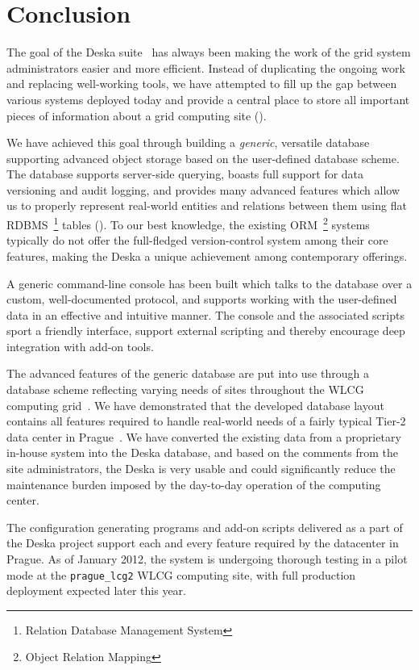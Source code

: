 \documentclass[deska]{subfiles}
\begin{document}
\chapter{Conclusion}
\label{sec:conclusion}

The goal of the Deska suite~\cite{deska-project} has always been making the work of the grid system administrators
easier and more efficient.  Instead of duplicating the ongoing work and replacing well-working tools, we have attempted
to fill up the gap between various systems deployed today and provide a central place to store all important pieces of
information about a grid computing site ().

We have achieved this goal through building a {\em generic}, versatile database supporting advanced object storage based
on the user-defined database scheme.  The database supports server-side querying, boasts full support for data
versioning and audit logging, and provides many advanced features which allow us to properly represent real-world
entities and relations between them using flat RDBMS~\footnote{Relation Database Management System} tables
().  To our best knowledge, the existing ORM~\footnote{Object Relation Mapping}
systems typically do not offer the full-fledged version-control system among their core features, making the Deska a
unique achievement among contemporary offerings.

A generic command-line console has been built which talks to the database over a custom, well-documented protocol, and
supports working with the user-defined data in an effective and intuitive manner.  The console and the associated
scripts sport a friendly interface, support external scripting and thereby encourage deep integration with add-on tools.

The advanced features of the generic database are put into use through a database scheme reflecting varying needs of
sites throughout the WLCG computing grid~\cite{wlcg}.  We have demonstrated that the developed database layout contains
all features required to handle real-world needs of a fairly typical Tier-2 data center in Prague~\cite{farm}.  We have
converted the existing data from a proprietary in-house system into the Deska database, and based on the comments from
the site administrators, the Deska is very usable and could significantly reduce the maintenance burden imposed by the
day-to-day operation of the computing center.

The configuration generating programs and add-on scripts delivered as a part of the Deska project support each and every
feature required by the datacenter in Prague.  As of January 2012, the system is undergoing thorough testing in a pilot
mode at the {\tt prague\_lcg2} WLCG computing site, with full production deployment expected later this year.
\end{document}
